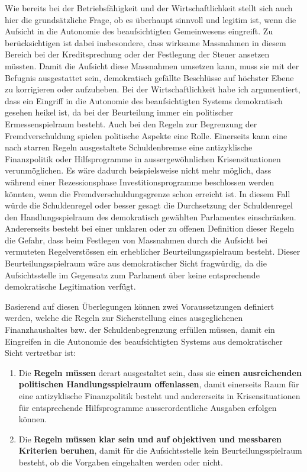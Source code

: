 \documentclass[10pt]{article}
\begin{document}
Wie bereits bei der Betriebsfähigkeit und der Wirtschaftlichkeit stellt sich auch hier die grundsätzliche Frage, ob es überhaupt sinnvoll und legitim ist, wenn die Aufsicht in die Autonomie des beaufsichtigten Gemeinwesens eingreift. Zu berücksichtigen ist dabei insbesondere, dass wirksame Massnahmen in diesem Bereich bei der Kreditsprechung oder der Festlegung der Steuer ansetzen müssten. Damit die Aufsicht diese Massnahmen umsetzen kann, muss sie mit der Befugnis ausgestattet sein, demokratisch gefällte Beschlüsse auf höchster Ebene zu korrigieren oder aufzuheben. Bei der Wirtschaftlichkeit habe ich argumentiert, dass ein Eingriff in die Autonomie des beaufsichtigten Systems demokratisch gesehen heikel ist, da bei der Beurteilung immer ein politischer Ermessenspielraum besteht. Auch bei den Regeln zur Begrenzung der Fremdverschuldung spielen politische Aspekte eine Rolle. Einerseits kann eine nach starren Regeln ausgestaltete Schulden­bremse eine antizyklische Finanzpolitik oder Hilfsprogramme in ausserge­wöhnlichen Krisensituationen verunmöglichen. Es wäre dadurch beispielsweise nicht mehr möglich, dass während einer Rezessions­phase Investitionsprogramme beschlossen werden könnten, wenn die Fremdverschuldungs­grenze schon erreicht ist. In diesem Fall würde die Schuldenregel oder besser gesagt die Durchsetzung der Schuldenregel den Handlungsspielraum des demokratisch gewählten Parlamentes einschränken. Andererseits besteht bei einer unklaren oder zu offenen Definition dieser Regeln die Gefahr, dass beim Festlegen von Massnahmen durch die Aufsicht bei vermuteten Regelverstössen ein erheblicher Beurteilungsspielraum besteht. Dieser Beurteilungsspielraum wäre aus demokratischer Sicht fragwürdig, da die Aufsichtsstelle im Gegensatz zum Parlament über keine entsprechende demokratische Legitimation verfügt.

Basierend auf diesen Überlegungen können zwei Voraussetzungen definiert werden, welche die Regeln zur Sicherstellung eines ausgeglichenen Finanzhaushaltes bzw. der Schuldenbegrenzung erfüllen müssen, damit ein Eingreifen in die Autonomie des beauf­sichtigten Systems aus demokratischer Sicht vertretbar ist:

\begin{enumerate}
    \item Die \textbf{Regeln müssen} derart ausgestaltet sein, dass sie \textbf{einen ausreichenden politischen Handlungsspielraum offenlassen}, damit einerseits Raum für eine antizyklische Finanzpolitik besteht und andererseits in Krisensituationen für entsprechende Hilfsprogramme ausserordentliche Ausgaben erfolgen können.

    \item Die \textbf{Regeln müssen klar sein und auf objektiven und messbaren Kriterien beruhen}, damit für die Aufsichtsstelle kein Beurteilungsspielraum besteht, ob die Vorgaben eingehalten werden oder nicht.

\end{enumerate}
\end{document}
